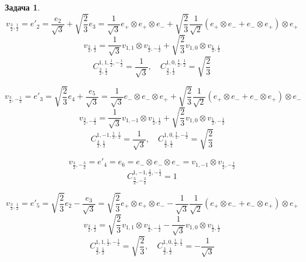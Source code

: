 \documentclass[12pt]{article}
\theoremstyle{definition}
\newtheorem{zad}{Задача}[section]
\begin{document}
\begin{zad}
    \begin{equation}
        v_{\frac{3}{2},\frac{1}{2}}=e'_2=\frac{e_2}{\sqrt{3}}+\sqrt{\frac{2}{3}}e_3=\frac{1}{\sqrt{3}}e_+\otimes e_+\otimes e_-+\sqrt{\frac{2}{3}}\frac{1}{\sqrt{2}}(e_+\otimes e_-+e_-\otimes e_+)\otimes e_+
    \end{equation}
    \begin{equation}
        v_{\frac{3}{2},\frac{1}{2}}=\frac{1}{\sqrt{3}}v_{1,1}\otimes v_{\frac{1}{2},-\frac{1}{2}}+\sqrt{\frac{2}{3}}v_{1,0}\otimes v_{\frac{1}{2},\frac{1}{2}}
    \end{equation}
    \begin{equation}
        \boxed{C_{\frac{3}{2},\frac{1}{2}}^{1,1,\frac{1}{2},-\frac{1}{2}}=\frac{1}{\sqrt{3}},\quad C_{\frac{3}{2},\frac{1}{2}}^{1,0,\frac{1}{2},\frac{1}{2}}=\sqrt{\frac{2}{3}}}
    \end{equation}
    
    \begin{equation}
        v_{\frac{3}{2},-\frac{1}{2}}=e'_3=\sqrt{\frac{2}{3}}e_4+\frac{e_5}{\sqrt{3}}=\frac{1}{\sqrt{3}}e_-\otimes e_-\otimes e_++\sqrt{\frac{2}{3}}\frac{1}{\sqrt{2}}(e_+\otimes e_-+e_-\otimes e_+)\otimes e_-
    \end{equation}
    \begin{equation}
        v_{\frac{3}{2},-\frac{1}{2}}=\frac{1}{\sqrt{3}}v_{1,-1}\otimes v_{\frac{1}{2},\frac{1}{2}}+\sqrt{\frac{2}{3}}v_{1,0}\otimes v_{\frac{1}{2},-\frac{1}{2}}
    \end{equation}
    \begin{equation}
        \boxed{C_{\frac{3}{2},\frac{1}{2}}^{1,-1,\frac{1}{2},\frac{1}{2}}=\frac{1}{\sqrt{3}},\quad C_{\frac{3}{2},\frac{1}{2}}^{1,0,\frac{1}{2},-\frac{1}{2}}=\sqrt{\frac{2}{3}}}
    \end{equation}
    
    \begin{equation}
        v_{\frac{3}{2},-\frac{3}{2}}=e'_4=e_6=e_-\otimes e_-\otimes e_-=v_{1,-1}\otimes v_{\frac{1}{2},-\frac{1}{2}}
    \end{equation}
    \begin{equation}
        \boxed{C_{\frac{3}{2},-\frac{3}{2}}^{1,-1,\frac{1}{2},-\frac{1}{2}}=1}
    \end{equation}
    
    \begin{equation}
        v_{\frac{3}{2},\frac{1}{2}}=e'_5=\sqrt{\frac{2}{3}}e_2-\frac{e_3}{\sqrt{3}}=\sqrt{\frac{2}{3}}e_+\otimes e_+\otimes e_--\frac{1}{\sqrt{3}}\frac{1}{\sqrt{2}}(e_+\otimes e_-+e_-\otimes e_+)\otimes e_+
    \end{equation}
    \begin{equation}
        v_{\frac{3}{2},\frac{1}{2}}=\sqrt{\frac{2}{3}}v_{1,1}\otimes v_{\frac{1}{2},-\frac{1}{2}}-\frac{1}{\sqrt{3}}v_{1,0}\otimes v_{\frac{1}{2},\frac{1}{2}}
    \end{equation}
    \begin{equation}
        \boxed{C_{\frac{3}{2},\frac{1}{2}}^{1,1,\frac{1}{2},-\frac{1}{2}}=\sqrt{\frac{2}{3}},\quad C_{\frac{3}{2},\frac{1}{2}}^{1,0,\frac{1}{2},\frac{1}{2}}=-\frac{1}{\sqrt{3}}}
    \end{equation}
    

\end{zad}
\end{document}
